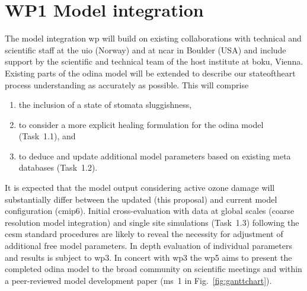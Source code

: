 \section{WP1 Model integration}
\label{sec:wp1}
The model integration \gls{wp} will build on existing collaborations with technical and scientific staff at the \gls{uio} (Norway) and at \gls{ncar} in Boulder (USA) and include support by the scientific and technical team of the host institute at \gls{boku}, Vienna. Existing parts of the \gls{odina} model will be extended to describe our stateoftheart process understanding as accurately as possible. This will comprise
\begin{enumerate}
  \itemsep0pt
\item the inclusion of a state of stomata sluggishness,
\item to  consider a more explicit healing formulation for the \gls{odina} model (Task~1.1),  and
\item to deduce and update additional model parameters based on existing meta databases (Task~1.2).
\end{enumerate}
It is expected that the model output considering  active ozone damage will substantially differ between the updated (this proposal) and current model configuration (\gls{cmip}6). Initial cross-evaluation with data at global scales (coarse resolution model integration) and single site simulations (Task~1.3) following the \gls{cesm} standard procedures are likely to reveal the necessity for adjustment of additional free model parameters. In depth evaluation of individual parameters and results is subject to \gls{wp}3. In concert with \gls{wp}3 the \gls{wp}5 aims to present the  completed \gls{odina} model to the broad community on scientific meetings and within  a peer-reviewed model development paper (\gls{ms}~1 in Fig.~\ref{fig:ganttchart}).

